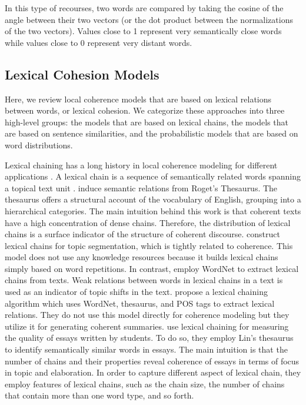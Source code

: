 In this type of recourses, two words are compared by taking the cosine of the angle between their two vectors (or the dot product between the normalizations of the two vectors). 
Values close to 1 represent very semantically close words while values close to 0 represent very distant words. 

\subsection{Lexical Cohesion Models}

Here, we review local coherence models that are based on lexical relations between words, or lexical cohesion. 
We categorize these approaches into three high-level groups: the models that are based on lexical chains, the models that are based on sentence similarities, and the probabilistic models that are based on word distributions.  

Lexical chaining has a long history in local coherence modeling for different applications \cite{morris91,fenglijun09,wongbillytm12,benguosheng13,flor13}. 
A lexical chain is a sequence of semantically related words spanning a topical text unit \cite{morris91}. 
 induce semantic relations from Roget's Thesaurus. 
The thesaurus offers a structural account of the vocabulary of English, grouping into a hierarchical  categories. 
The main intuition behind this work is that coherent texts have a high concentration of dense chains. 
Therefore, the distribution of lexical chains is a surface indicator of the structure of coherent discourse. 
 construct lexical chains for topic segmentation, which is tightly related to coherence. 
This model does not use any knowledge resources because it builds lexical chains simply based on word repetitions. 
In contrast,  employ WordNet to extract lexical chains from texts.  
Weak relations between words in lexical chains in a text is used as an indicator of topic shifts in the text. 
 propose a lexical chaining algorithm which uses WordNet, thesaurus, and POS tags to extract lexical relations. 
They do not use this model directly for coherence modeling but they utilize it for generating coherent summaries. 
 use lexical chaining for measuring the quality of essays written by students. 
To do so, they employ Lin’s thesaurus \cite{lindekang98} to identify semantically similar words in essays.   
The main intuition is that the number of chains and their properties reveal coherence of essays in terms of focus in topic and elaboration. 
In order to capture different aspect of lexical chain, they employ features of lexical chains, such as the chain size, the number of chains that contain more than one word type, and so forth. 

